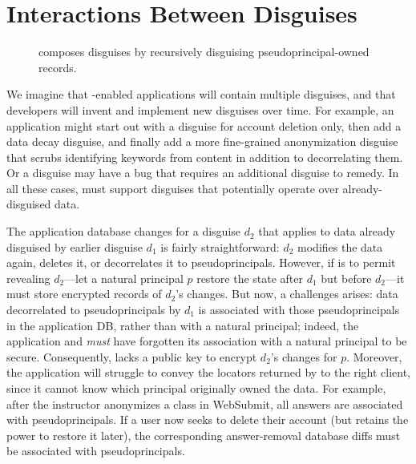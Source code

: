 \section{Interactions Between Disguises}
\label{s:composition}

\begin{figure}[t]
    \centering
    \caption{\sys composes disguises by recursively disguising
             pseudoprincipal-owned records.}
    \label{f:recursive}
\end{figure}

%
We imagine that \sys-enabled applications will contain multiple
disguises, and that developers will invent and implement new disguises
over time.
%
For example, an application might start out with a disguise for account
deletion only, then add a data decay disguise, and finally add a more
fine-grained anonymization disguise that scrubs identifying keywords
from content in addition to decorrelating them.
%
Or a disguise may have a bug that requires an additional disguise
to remedy.
%
In all these cases, \sys must support disguises that potentially
operate over already-disguised data.
%

%
The application database changes for a disguise $d_2$ that applies
to data already disguised by earlier disguise $d_1$ is fairly
straightforward: $d_2$ modifies the data again, deletes it, or
decorrelates it to pseudoprincipals.
%
However, if \sys is to permit revealing $d_2$---\ie let a natural
principal $p$ restore the state after $d_1$ but before $d_2$---it must
store encrypted records of $d_2$'s changes.
%
But now, a challenges arises: data decorrelated to pseudoprincipals
by $d_1$ is associated with those pseudoprincipals in the application
DB, rather than with a natural principal; indeed, the application
and \sys \emph{must} have forgotten its association with a natural
principal to be secure.
%
Consequently, \sys lacks a public key to encrypt $d_2$'s changes
for $p$.
%
Moreover, the application will struggle to convey the locators returned
by \sys to the right client, since it cannot know which principal
originally owned the data.
%
For example, after the instructor anonymizes a class in WebSubmit, all
answers are associated with pseudoprincipals.
%
If a user now seeks to delete their account (but retains the power to
restore it later), the corresponding answer-removal database diffs
must be associated with pseudoprincipals.
%
%

